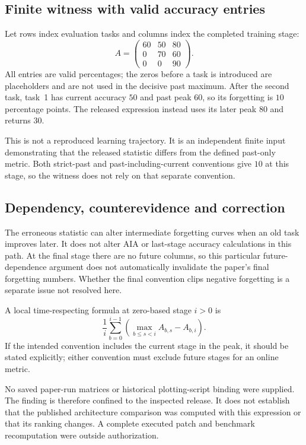 \documentclass[10pt]{article}
\begin{document}
\subsection*{Finite witness with valid accuracy entries}
Let rows index evaluation tasks and columns index the completed training stage: \[A=\begin{pmatrix}
 60&50&80\\
 0&70&60\\
 0&0&90
 \end{pmatrix}.\] All entries are valid percentages; the zeros before a task is introduced are placeholders and are not used in the decisive past maximum. After the second task, task 1 has current accuracy \(50\) and past peak \(60\), so its forgetting is \(10\) percentage points. The released expression instead uses its later peak \(80\) and returns \(30\).\par
This is not a reproduced learning trajectory. It is an independent finite input demonstrating that the released statistic differs from the defined past-only metric. Both strict-past and past-including-current conventions give \(10\) at this stage, so the witness does not rely on that separate convention.\par
\subsection*{Dependency, counterevidence and correction}
The erroneous statistic can alter intermediate forgetting curves when an old task improves later. It does not alter AIA or last-stage accuracy calculations in this path. At the final stage there are no future columns, so this particular future-dependence argument does not automatically invalidate the paper’s final forgetting numbers. Whether the final convention clips negative forgetting is a separate issue not resolved here.\par
A local time-respecting formula at zero-based stage \(i>0\) is \[\frac1i\sum_{b=0}^{i-1}
       \left(\max_{b\le s<i}A_{b,s}-A_{b,i}\right).\] If the intended convention includes the current stage in the peak, it should be stated explicitly; either convention must exclude future stages for an online metric.\par
No saved paper-run matrices or historical plotting-script binding were supplied. The finding is therefore confined to the inspected release. It does not establish that the published architecture comparison was computed with this expression or that its ranking changes. A complete executed patch and benchmark recomputation were outside authorization.\par
\end{document}
